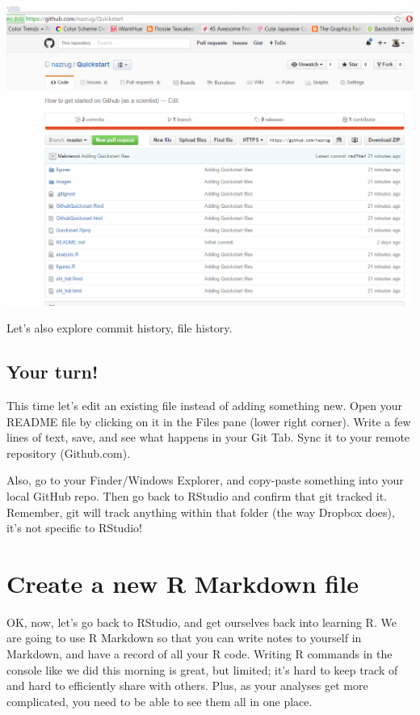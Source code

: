 \documentclass[]{book}
\theoremstyle{definition}
\theoremstyle{definition}
\theoremstyle{definition}
\theoremstyle{remark}
\begin{document}
\includegraphics{img/Github_remote.png}

Let's also explore commit history, file history.

\subsection{Your turn!}\label{your-turn-3}

This time let's edit an existing file instead of adding something new.
Open your README file by clicking on it in the Files pane (lower right
corner). Write a few lines of text, save, and see what happens in your
Git Tab. Sync it to your remote repository (Github.com).

Also, go to your Finder/Windows Explorer, and copy-paste something into
your local GitHub repo. Then go back to RStudio and confirm that git
tracked it. Remember, git will track anything within that folder (the
way Dropbox does), it's not specific to RStudio!

\section{Create a new R Markdown
file}\label{create-a-new-r-markdown-file}

OK, now, let's go back to RStudio, and get ourselves back into learning
R. We are going to use R Markdown so that you can write notes to
yourself in Markdown, and have a record of all your R code. Writing R
commands in the console like we did this morning is great, but limited;
it's hard to keep track of and hard to efficiently share with others.
Plus, as your analyses get more complicated, you need to be able to see
them all in one place.
\end{document}
